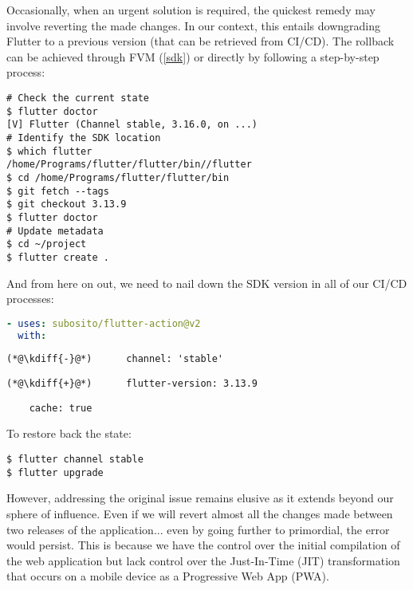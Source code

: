 Occasionally, when an urgent solution is required, the quickest remedy may involve reverting  the made 
changes. In our context, this entails downgrading Flutter to a previous version (that can be retrieved from CI/CD). 
The rollback can be achieved through FVM (\ref{sdk}) or directly by following a step-by-step process:

\begin{lstlisting}[language=terminal]
# Check the current state
$ flutter doctor
[V] Flutter (Channel stable, 3.16.0, on ...)
# Identify the SDK location
$ which flutter
/home/Programs/flutter/flutter/bin//flutter
$ cd /home/Programs/flutter/flutter/bin
$ git fetch --tags
$ git checkout 3.13.9
$ flutter doctor
# Update metadata
$ cd ~/project
$ flutter create .
\end{lstlisting}

\noindent And from here on out, we need to nail down the SDK version in all of our CI/CD processes:

\begin{lstlisting}[language=yaml]
- uses: subosito/flutter-action@v2
  with:
\end{lstlisting}
{
\xpretocmd{\lstlisting}{\vspace{-12pt}}{}{}
\begin{lstlisting}[firstnumber=2, backgroundcolor=\color{backred}]
(*@\kdiff{-}@*)      channel: 'stable'
\end{lstlisting}
\begin{lstlisting}[firstnumber=2, backgroundcolor=\color{backgreen}]
(*@\kdiff{+}@*)      flutter-version: 3.13.9
\end{lstlisting}
\begin{lstlisting}
    cache: true
\end{lstlisting}
}

\noindent To restore back the state:

\begin{lstlisting}[language=terminal]
$ flutter channel stable
$ flutter upgrade
\end{lstlisting}

\noindent However, addressing the original issue remains elusive as it extends beyond our sphere of influence. Even if 
we will revert almost all the changes made between two releases of the application... even by going further to primordial, 
the error would persist. This is because we have the control over the initial compilation of the web application but lack 
control over the Just-In-Time (JIT) transformation that occurs on a mobile device as a Progressive Web App (PWA).

